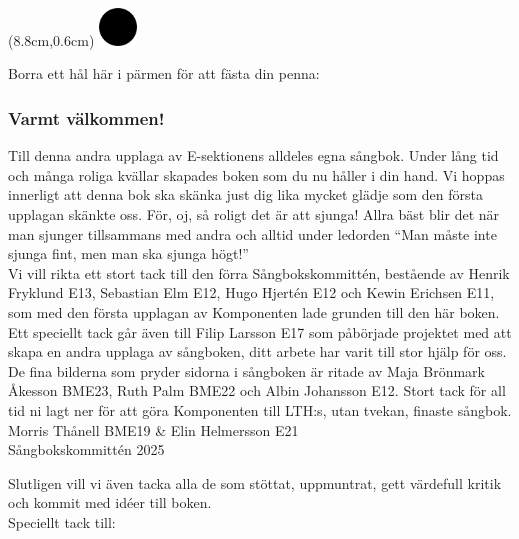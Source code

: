 
\begin{textblock*}{3cm}(8.8cm,0.6cm) %
   \includegraphics[width=1.0cm]{./bilder/cirkel.png}
\end{textblock*}

\vspace*{-8mm}
Borra ett hål här i pärmen för att fästa din penna:

\subsubsection*{Varmt välkommen!}

Till denna andra upplaga av E-sektionens alldeles egna sångbok. Under lång tid och många roliga kvällar skapades boken som du nu håller i din hand. Vi hoppas innerligt att denna bok ska skänka just dig lika mycket glädje som den första upplagan skänkte oss. För, oj, så roligt det är att sjunga! Allra bäst blir det när man sjunger tillsammans med andra och alltid under ledorden “Man måste inte sjunga fint, men man ska sjunga högt!”
\\

Vi vill rikta ett stort tack till den förra Sångbokskommittén, bestående av Henrik Fryklund E13, Sebastian Elm E12, Hugo Hjertén E12 och  Kewin Erichsen E11, som med den första upplagan av Komponenten lade grunden till den här boken.
\\

Ett speciellt tack går även till Filip Larsson E17 som påbörjade projektet med att skapa en andra upplaga av sångboken, ditt arbete har varit till stor hjälp för oss.
\\

De fina bilderna som pryder sidorna i sångboken är ritade av Maja Brönmark Åkesson BME23, Ruth Palm BME22 och Albin Johansson E12. Stort tack för all tid ni lagt ner för att  göra Komponenten till LTH:s, utan tvekan, finaste sångbok.
\\

Morris Thånell BME19 \& Elin Helmersson E21\\
Sångbokskommittén 2025



\newpage
Slutligen vill vi även tacka alla de som stöttat, uppmuntrat, gett värdefull kritik och kommit med idéer till boken.
\\Speciellt tack till:\\

